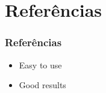 \documentclass{beamer}
\begin{document}
\section{Refer\^encias}
\begin{frame}
    \frametitle{Refer\^encias}

    \begin{itemize}
        \item Easy to use
        \item Good results
    \end{itemize}
\end{frame}
\end{document}
